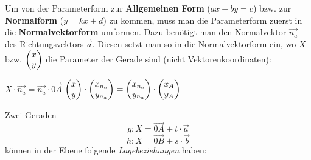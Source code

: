
Um von der Parameterform zur \textbf{Allgemeinen Form} ($ax + by = c$) bzw. zur \textbf{Normalform} ($y = kx + d$) zu kommen, muss man die Parameterform zuerst in die \textbf{Normalvektorform} umformen. Dazu ben\"{o}tigt man den Normalvektor $\vec{n_{a}}$ des Richtungsvektors $\vec{a}$. Diesen setzt man so in die Normalvektorform ein, wo $X$ bzw. $\begin{pmatrix}x\\y\end{pmatrix}$ die Parameter der Gerade sind (nicht Vektorenkoordinaten):

\begin{center}
  $X \cdot \vec{n_{a}} = \vec{n_{a}} \cdot \vec{0A}$
  \extrapar
  $\begin{pmatrix}x\\y\end{pmatrix} \cdot \begin{pmatrix}x_{n_{a}}\\y_{n_{a}}\end{pmatrix} = \begin{pmatrix}x_{n_{a}}\\y_{n_{a}}\end{pmatrix} \cdot \begin{pmatrix}x_{A} \\ y_{A}\end{pmatrix}$
\end{center}


Zwei Geraden $$g: X = \vec{0A} + t \cdot \vec{a}$$ $$h: X = \vec{0B} + s \cdot \vec{b}$$ k\"{o}nnen in der Ebene folgende \emph{Lagebeziehungen} haben:

